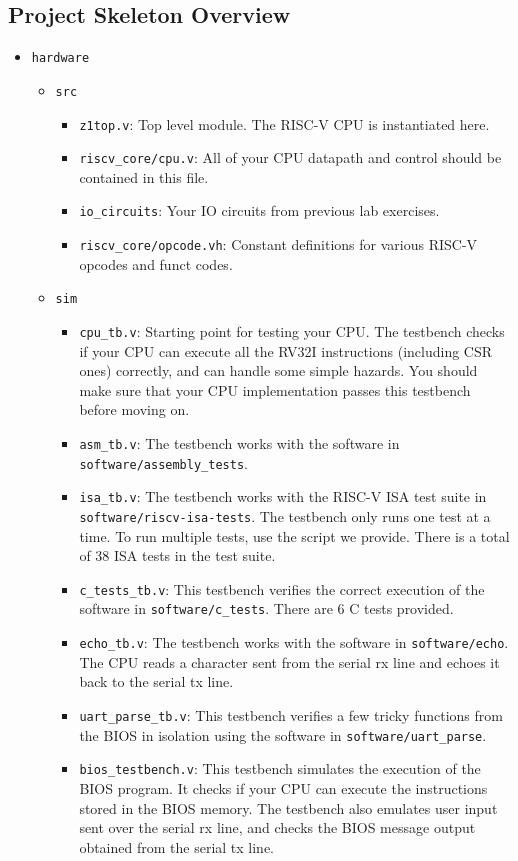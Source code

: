 \documentclass[11pt]{article}
\begin{document}
\subsection{Project Skeleton Overview}
\begin{itemize}
  \item \texttt{hardware}
    \begin{itemize}
      \item \texttt{src}
        \begin{itemize}
          \item \texttt{z1top.v}: Top level module. The RISC-V CPU is instantiated here.
          \item \texttt{riscv\_core/cpu.v}: All of your CPU datapath and control should be contained in this file.
          \item \texttt{io\_circuits}: Your IO circuits from previous lab exercises.
          \item \texttt{riscv\_core/opcode.vh}: Constant definitions for various RISC-V opcodes and funct codes.
        \end{itemize}
      \item \texttt{sim}
        \begin{itemize}
          \item \verb|cpu_tb.v|: Starting point for testing your CPU. The testbench checks if your CPU can execute all the RV32I instructions (including CSR ones) correctly, and can handle some simple hazards. You should make sure that your CPU implementation passes this testbench before moving on.
          \item \verb|asm_tb.v|: The testbench works with the software in \texttt{software/assembly\_tests}.
          \item \verb|isa_tb.v|: The testbench works with the RISC-V ISA test suite in \texttt{software/riscv-isa-tests}. The testbench only runs one test at a time. To run multiple tests, use the script we provide. There is a total of 38 ISA tests in the test suite.

          \item \verb|c_tests_tb.v|: This testbench verifies the correct execution of the software in \texttt{software/c\_tests}. There are 6 C tests provided.
          \item \verb|echo_tb.v|: The testbench works with the software in \texttt{software/echo}. The CPU reads a character sent from the serial rx line and echoes it back to the serial tx line.
          \item \verb|uart_parse_tb.v|: This testbench verifies a few tricky functions from the BIOS in isolation using the software in \texttt{software/uart\_parse}.
          \item \verb|bios_testbench.v|: This testbench simulates the execution of the BIOS program. It checks if your CPU can execute the instructions stored in the BIOS memory. The testbench also emulates user input sent over the serial rx line, and checks the BIOS message output obtained from the serial tx line.
          \end{itemize}


\end{itemize}
\end{itemize}
\end{document}
